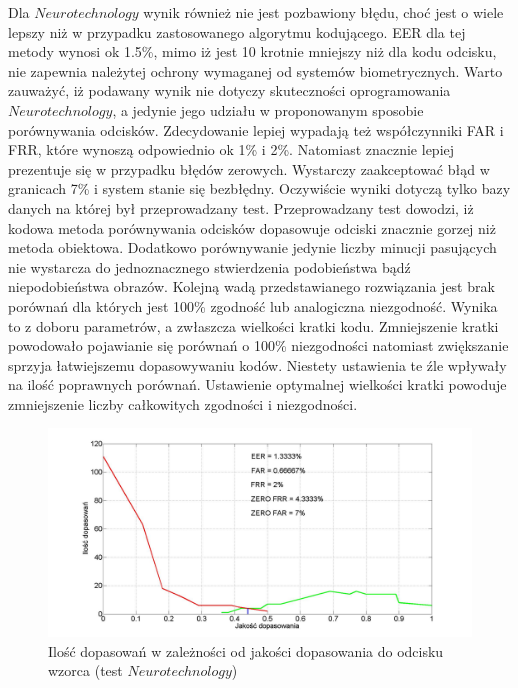 \vspace{.5cm}\par
Dla $Neurotechnology$ wynik również nie jest pozbawiony błędu, choć jest o wiele lepszy niż w przypadku zastosowanego algorytmu kodującego. EER dla tej metody wynosi ok 1.5\%, mimo iż jest 10 krotnie mniejszy niż dla kodu odcisku,  nie zapewnia należytej ochrony wymaganej od systemów biometrycznych. Warto zauważyć, iż podawany wynik nie dotyczy skuteczności oprogramowania $Neurotechnology$, a jedynie jego udziału w proponowanym sposobie porównywania odcisków. Zdecydowanie lepiej wypadają też współczynniki FAR i FRR, które wynoszą odpowiednio ok 1\% i 2\%. Natomiast znacznie lepiej prezentuje się w przypadku błędów zerowych. Wystarczy zaakceptować błąd w granicach 7\% i system stanie się bezbłędny. Oczywiście wyniki dotyczą tylko bazy danych na której był przeprowadzany test. Przeprowadzany test dowodzi, iż kodowa metoda porównywania odcisków dopasowuje odciski znacznie gorzej niż metoda obiektowa. Dodatkowo porównywanie jedynie liczby minucji pasujących nie wystarcza do jednoznacznego stwierdzenia podobieństwa bądź niepodobieństwa obrazów. Kolejną wadą przedstawianego rozwiązania jest brak porównań dla których jest 100\% zgodność lub analogiczna niezgodność. Wynika to z doboru parametrów, a zwłaszcza wielkości kratki kodu. Zmniejszenie kratki powodowało pojawianie się porównań o 100\% niezgodności natomiast zwiększanie sprzyja łatwiejszemu dopasowywaniu kodów. Niestety ustawienia te źle wpływały na ilość poprawnych porównań. Ustawienie optymalnej wielkości kratki powoduje zmniejszenie liczby całkowitych zgodności i niezgodności.

\begin{figure}[!hbt]
    \begin{center}
		\includegraphics[angle=0,scale=0.27]{img/pattern_line_statistic_analyses_ob_way.jpg}
		\caption{Ilość dopasowań w zależności od jakości dopasowania do odcisku wzorca (test $Neurotechnology$)}
		\label{img:ob_stat_line_pattern}
    \end{center}
\end{figure} 
\newpage 

